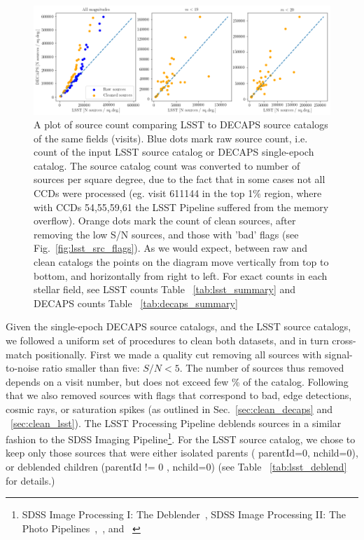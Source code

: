\documentclass[DM,lsstdraft,toc,usenatbib]{lsstdoc}
\begin{document}
\begin{figure}
\begin{centering}
\includegraphics[width=0.6\columnwidth]{figs/decaps_lsst_source_count.png}
\caption{A plot of source count comparing LSST to DECAPS source catalogs of the same fields (visits). Blue dots mark raw source count, i.e. count of the input LSST  source catalog or DECAPS single-epoch catalog. The source catalog count was converted to number of sources per square degree, due to the fact that in some cases not all CCDs were processed (eg. visit 611144 in the top 1\% region, where with CCDs 54,55,59,61 the LSST Pipeline suffered from the memory overflow).  Orange dots mark the count of clean sources, after removing the low S/N sources,  and those with 'bad' flags (see Fig.~\ref{fig:lsst_src_flags}). As we would expect, between raw and clean catalogs the points on the diagram move vertically from top to bottom, and horizontally from right to left. For exact counts in each stellar field, see LSST counts Table ~\ref{tab:lsst_summary} and DECAPS counts Table ~\ref{tab:decaps_summary}}
\label{fig:lsst_count_comparison}
\end{centering}
\end{figure} 


Given the single-epoch DECAPS source catalogs, and the LSST source catalogs, we followed a uniform set of procedures to clean both datasets, and in turn cross-match positionally. First we made a quality cut removing all sources with signal-to-noise ratio smaller than five:  $S/N < 5$. The number of sources thus removed depends on a visit number, but does not exceed few \% of the catalog. Following that we also removed sources with flags that correspond to bad, edge detections, cosmic rays, or saturation spikes (as outlined in Sec.~\ref{sec:clean_decaps} and ~\ref{sec:clean_lsst}). The LSST Processing Pipeline deblends sources in a similar fashion to the SDSS Imaging Pipeline\footnote{SDSS Image Processing I: The Deblender~\citep{lupton2005}, SDSS Image Processing II: The Photo Pipelines~\citep{lupton2001},~\citep{lupton2002}, and ~\citep{lupton2005a}}.   For the LSST source catalog,  we chose to keep only those sources that were either isolated parents ( parentId=0, nchild=0), or deblended children (parentId != 0 , nchild=0) (see Table ~\ref{tab:lsst_deblend} for details.)
\end{document}
